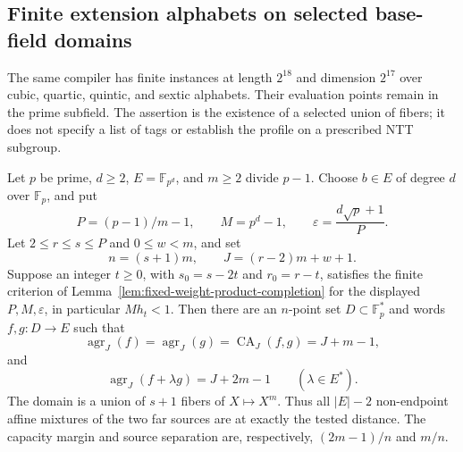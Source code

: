 \subsection{Finite extension alphabets on selected base-field domains}
\label{subsec:extension-native-short-domains}

The same compiler has finite instances at length $2^{18}$ and dimension
$2^{17}$ over cubic, quartic, quintic, and sextic alphabets.  Their
evaluation points remain in the prime subfield.  The assertion is the
existence of a selected union of fibers; it does not specify a list of
tags or establish the profile on a prescribed NTT subgroup.

\begin{proposition}\label{prop:extension-native-selected-fibers}
Let $p$ be prime, $d\ge2$, $E=\mathbb F_{p^d}$, and $m\ge2$ divide
$p-1$.  Choose $b\in E$ of degree $d$ over $\mathbb F_p$, and put
\[
 P=(p-1)/m-1,\qquad M=p^d-1,\qquad
 \varepsilon=\frac{d\sqrt p+1}{P}.
\]
Let $2\le r\le s\le P$ and $0\le w<m$, and set
\[
 n=(s+1)m,\qquad J=(r-2)m+w+1.
\]
Suppose an integer $t\ge0$, with $s_0=s-2t$ and $r_0=r-t$,
satisfies the finite criterion of
Lemma~\ref{lem:fixed-weight-product-completion} for the displayed
$P,M,\varepsilon$, in particular $Mh_t<1$.
Then there are an $n$-point set $D\subset\mathbb F_p^*$ and words
$f,g:D\to E$ such that
\[
 \operatorname{agr}_J(f)=\operatorname{agr}_J(g)
 =\operatorname{CA}_J(f,g)=J+m-1,
\]
and
\[
 \operatorname{agr}_J(f+\lambda g)=J+2m-1
 \qquad(\lambda\in E^*).
\]
The domain is a union of $s+1$ fibers of $X\mapsto X^m$.
Thus all $|E|-2$ non-endpoint affine mixtures of the two far sources
are at exactly the tested distance.  The capacity margin and source
separation are, respectively, $(2m-1)/n$ and $m/n$.
\end{proposition}
